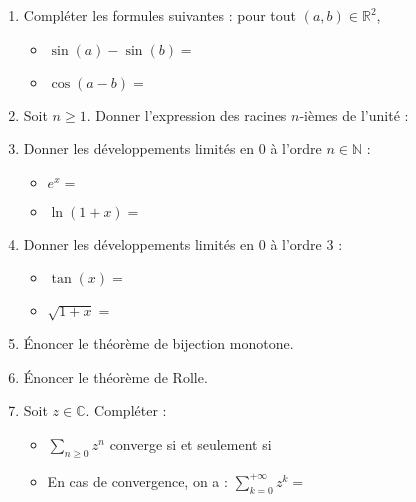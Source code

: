 \documentclass[twoside,french,11pt]{VcCours}
\begin{document}
\begin{enumerate}
\item Compléter les formules suivantes : pour tout $(a,b) \in \mathbb{R}^2$,

\medskip
\begin{itemize}
\item$\sin(a)-\sin(b) = $

\bigskip
\item $\cos(a-b) = $
\end{itemize}

\medskip
\item Soit $n \geq 1$. Donner l'expression des racines $n$-ièmes de l'unité :

\vspace{3cm}

\item Donner les développements limités en $0$ à l'ordre $n \in \mathbb{N}$ :

\medskip
\begin{itemize}
\item $e^x =$

\bigskip
\item $\ln(1+x) = $
\end{itemize}

\medskip
\item Donner les développements limités en $0$ à l'ordre $3$ :

\medskip
\begin{itemize}
\item $\tan(x)=$

\bigskip
\item $\sqrt{1+x}=$
\end{itemize}

\medskip
\item Énoncer le théorème de bijection monotone.

\vspace{4.5cm}


\item Énoncer le théorème de Rolle.

\vspace{4.5cm}



\item Soit $z \in \mathbb{C}$. Compléter :

\medskip
\begin{itemize}
\item $\sum_{n \geq 0} z^n$ converge si et seulement si

\item En cas de convergence, on a : $\sum_{k=0}^{+\infty} z^k =$
\end{itemize}


\end{enumerate}
\end{document}
